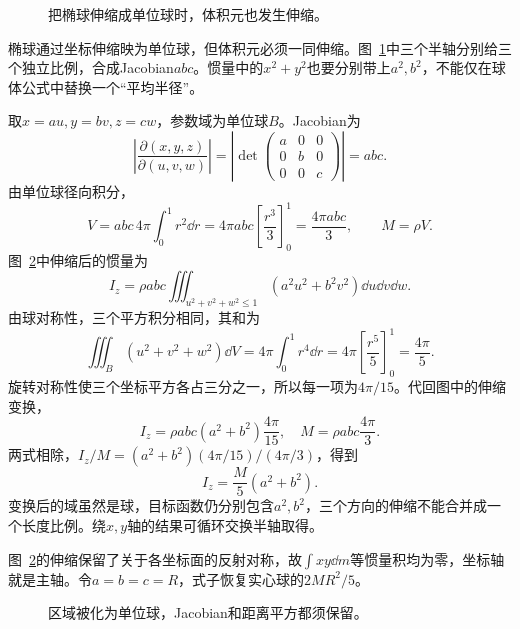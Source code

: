 \begin{figure}[H]\centering
{}
\caption{把椭球伸缩成单位球时，体积元也发生伸缩。}\label{fig:c4-h3-q}
\end{figure}
\begin{solution}
椭球通过坐标伸缩映为单位球，但体积元必须一同伸缩。图~\ref{fig:c4-h3-q}中三个半轴分别给三个独立比例，合成Jacobian$abc$。惯量中的$x^2+y^2$也要分别带上$a^2,b^2$，不能仅在球体公式中替换一个“平均半径”。


取$x=au,y=bv,z=cw$，参数域为单位球$B$。Jacobian为
\[\left|\frac{\partial(x,y,z)}{\partial(u,v,w)}\right|
=\left|\det\begin{pmatrix}a&0&0\\0&b&0\\0&0&c\end{pmatrix}\right|=abc.\]
由单位球径向积分，
\[V=abc\,4\pi\int_0^1r^2\dd r
=4\pi abc\left[\frac{r^3}{3}\right]_0^1=\frac{4\pi abc}{3},\qquad M=\rho V.\]
图~\ref{fig:c4-h3-s}中伸缩后的惯量为
\[I_z=\rho abc\iiint_{u^2+v^2+w^2\le1}(a^2u^2+b^2v^2)\dd u\dd v\dd w.
\]
由球对称性，三个平方积分相同，其和为
\[\iiint_B(u^2+v^2+w^2)\dd V
=4\pi\int_0^1r^4\dd r
=4\pi\left[\frac{r^5}{5}\right]_0^1=\frac{4\pi}5.\]
旋转对称性使三个坐标平方各占三分之一，所以每一项为$4\pi/15$。代回图中的伸缩变换，
\[I_z=\rho abc(a^2+b^2)\frac{4\pi}{15},\quad
M=\rho abc\frac{4\pi}3.\]
两式相除，$I_z/M=(a^2+b^2)(4\pi/15)/(4\pi/3)$，得到
\[\boxed{I_z=\frac M5(a^2+b^2)}.\]
变换后的域虽然是球，目标函数仍分别包含$a^2,b^2$，三个方向的伸缩不能合并成一个长度比例。绕$x,y$轴的结果可循环交换半轴取得。

图~\ref{fig:c4-h3-s}的伸缩保留了关于各坐标面的反射对称，故$\int xy\dd m$等惯量积均为零，坐标轴就是主轴。令$a=b=c=R$，式子恢复实心球的$2MR^2/5$。

\begin{figure}[H]\centering
{}
\caption{区域被化为单位球，Jacobian和距离平方都须保留。}\label{fig:c4-h3-s}
\end{figure}
\end{solution}

